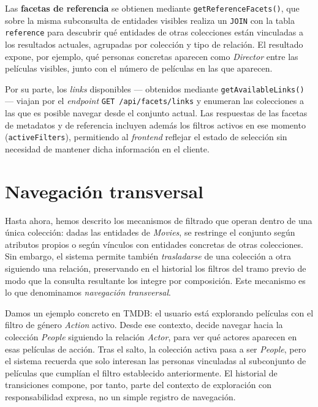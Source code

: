 Las \textbf{facetas de referencia} se obtienen mediante \texttt{getReferenceFacets()},
que sobre la misma subconsulta de entidades visibles realiza un \texttt{JOIN} con la
tabla \texttt{reference} para descubrir qué entidades de otras colecciones están
vinculadas a los resultados actuales, agrupadas por colección y tipo de relación.
El resultado expone, por ejemplo, qué personas concretas aparecen como \textit{Director}
entre las películas visibles, junto con el número de películas en las que aparecen.

Por su parte, los \textit{links} disponibles --- obtenidos mediante
\texttt{getAvailableLinks()} --- viajan por el \textit{endpoint}
\texttt{GET /api/facets/links} y enumeran las colecciones a las que es posible
navegar desde el conjunto actual. Las respuestas de las facetas de metadatos y de
referencia incluyen además los filtros activos en ese momento
(\texttt{activeFilters}), permitiendo al \textit{frontend} reflejar el estado de selección
sin necesidad de mantener dicha información en el cliente.

\section{Navegación transversal}
\label{sec:navegacion_transversal}

Hasta ahora, hemos descrito los mecanismos de filtrado que operan dentro de una única colección:
dadas las entidades de \textit{Movies}, se restringe el conjunto según atributos propios
o según vínculos con entidades concretas de otras colecciones. Sin embargo, el sistema
permite también \textit{trasladarse} de una colección a otra siguiendo una relación,
preservando en el historial los filtros del tramo previo de modo que la consulta resultante
los integre por composición. Este mecanismo es lo que denominamos \textit{navegación transversal}.

Damos un ejemplo concreto en TMDB: el usuario está explorando películas con el filtro de género
\textit{Action} activo. Desde ese contexto, decide navegar hacia la colección
\textit{People} siguiendo la relación \textit{Actor}, para ver qué actores aparecen en
esas películas de acción. Tras el salto, la colección activa pasa a ser \textit{People},
pero el sistema recuerda que solo interesan las personas vinculadas al subconjunto
de películas que cumplían el filtro establecido anteriormente. El historial de transiciones compone, por tanto,
parte del contexto de exploración con responsabilidad expresa, no un simple registro de navegación.

